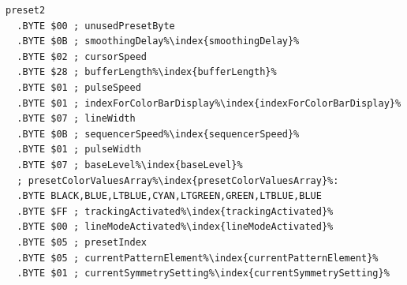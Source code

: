\hspace{0.1cm}
\begin{minipage}[b]{0.48\linewidth}                            
                                                                           
\begin{lstlisting}[basicstyle=\ttfamily\scriptsize,caption=Data structure for Preset 2.,escapechar=\%]
preset2
  .BYTE $00 ; unusedPresetByte
  .BYTE $0B ; smoothingDelay%\index{smoothingDelay}%
  .BYTE $02 ; cursorSpeed
  .BYTE $28 ; bufferLength%\index{bufferLength}%
  .BYTE $01 ; pulseSpeed
  .BYTE $01 ; indexForColorBarDisplay%\index{indexForColorBarDisplay}%
  .BYTE $07 ; lineWidth
  .BYTE $0B ; sequencerSpeed%\index{sequencerSpeed}%
  .BYTE $01 ; pulseWidth
  .BYTE $07 ; baseLevel%\index{baseLevel}%
  ; presetColorValuesArray%\index{presetColorValuesArray}%: 
  .BYTE BLACK,BLUE,LTBLUE,CYAN,LTGREEN,GREEN,LTBLUE,BLUE
  .BYTE $FF ; trackingActivated%\index{trackingActivated}%
  .BYTE $00 ; lineModeActivated%\index{lineModeActivated}%
  .BYTE $05 ; presetIndex
  .BYTE $05 ; currentPatternElement%\index{currentPatternElement}%
  .BYTE $01 ; currentSymmetrySetting%\index{currentSymmetrySetting}%
\end{lstlisting}
\end{minipage}


